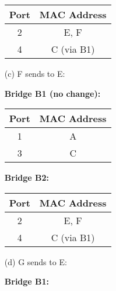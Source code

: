 \documentclass[11pt]{article}
\begin{document}
\begin{itemize}
\begin{table}[ht]
\begin{minipage}{.4\textwidth}
                \begin{tabular}{|c|c|}
                    \hline
                    Port & MAC Address \\
                    \hline
                    2    & E, F        \\
                    4    & C (via B1)  \\
                    \hline
                \end{tabular}
            \end{minipage}\label{tab:table-b}
        \end{table}



        \item[(c)] F sends to E:
            \begin{table}[ht]
            \centering
            \begin{minipage}{.4\textwidth}
                \centering
                \textbf{Bridge B1 (no change):}

                \begin{tabular}{|c|c|}
                    \hline
                    Port & MAC Address \\
                    \hline
                    1    & A           \\
                    3    & C           \\
                    \hline
                \end{tabular}
            \end{minipage}
            \begin{minipage}{.4\textwidth}
                \centering
                \textbf{Bridge B2:}

                \begin{tabular}{|c|c|}
                    \hline
                    Port & MAC Address \\
                    \hline
                    2    & E, F        \\
                    4    & C (via B1)  \\
                    \hline
                \end{tabular}
            \end{minipage}\label{tab:table-c}
        \end{table}

        \newpage

        \item[(d)] G sends to E:
        \begin{table}[ht]
            \centering
            \begin{minipage}{.35\textwidth}
                \centering
                \textbf{Bridge B1:}


\end{minipage}
\end{table}
\end{itemize}
\end{document}

